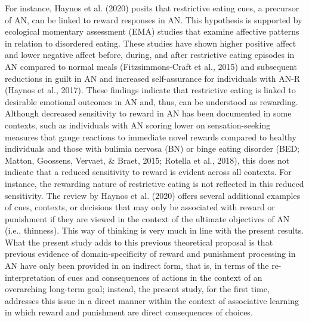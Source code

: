 \documentclass[
  man,floatsintext]{apa6}
\begin{document}
For instance, Haynos et al. (2020) posits that restrictive eating cues, a precursor of AN, can be linked to reward responses in AN. This hypothesis is supported by ecological momentary assessment (EMA) studies that examine affective patterns in relation to disordered eating. These studies have shown higher positive affect and lower negative affect before, during, and after restrictive eating episodes in AN compared to normal meals (Fitzsimmons-Craft et al., 2015) and subsequent reductions in guilt in AN and increased self-assurance for individuals with AN-R (Haynos et al., 2017).
These findings indicate that restrictive eating is linked to desirable emotional outcomes in AN and, thus, can be understood as rewarding. Although decreased sensitivity to reward in AN has been documented in some contexts, such as individuals with AN scoring lower on sensation-seeking measures that gauge reactions to immediate novel rewards compared to healthy individuals and those with bulimia nervosa (BN) or binge eating disorder (BED; Matton, Goossens, Vervaet, \& Braet, 2015; Rotella et al., 2018), this does not indicate that a reduced sensitivity to reward is evident across all contexts. For instance, the rewarding nature of restrictive eating is not reflected in this reduced sensitivity. The review by Haynos et al. (2020) offers several additional examples of cues, contexts, or decisions that may only be associated with reward or punishment if they are viewed in the context of the ultimate objectives of AN (i.e., thinness). This way of thinking is very much in line with the present results. What the present study adds to this previous theoretical proposal is that previous evidence of domain-specificity of reward and punishment processing in AN have only been provided in an indirect form, that is, in terms of the re-interpretation of cues and consequences of actions in the context of an overarching long-term goal; instead, the present study, for the first time, addresses this issue in a direct manner within the context of associative learning in which reward and punishment are direct consequences of choices.
\end{document}
